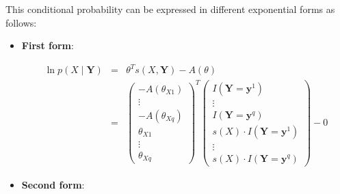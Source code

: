 \documentclass[11pt, oneside]{article}   	%
\numberwithin{figure}{section}
\numberwithin{equation}{section}
\numberwithin{table}{section}
\begin{document}
This conditional probability can be expressed in different exponential forms as follows:

\begin{itemize}

\item \textbf{First form}:

\begin{eqnarray*}
\ln p(X \mid \mathbf{Y}) &=& \theta^T s(X,\mathbf{Y}) - A(\theta) \\
&=&
\begin{pmatrix}
- A(\theta_{X1}) \\
\vdots \\
- A(\theta_{Xq}) \\
\theta_{X1} \\
\vdots \\
\theta_{Xq}
\end{pmatrix}^T
\begin{pmatrix}
I(\mathbf{Y} =\mathbf{y}^1) \\
\vdots \\
I(\mathbf{Y} =\mathbf{y}^q) \\
s(X) \cdot I(\mathbf{Y} =\mathbf{y}^1) \\
\vdots \\
s(X) \cdot I(\mathbf{Y} =\mathbf{y}^q)
\end{pmatrix}
- 0 
\end{eqnarray*}

\item \textbf{Second form}:


\end{itemize}
\end{document}
